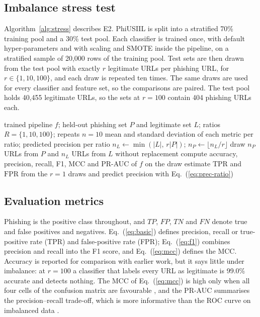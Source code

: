 \documentclass[pdflatex,sn-mathphys-num]{sn-jnl}%
\theoremstyle{thmstyleone}%
\theoremstyle{thmstyletwo}%
\theoremstyle{thmstylethree}%
\begin{document}
\subsection{Imbalance stress test}\label{subsec3-6}

Algorithm~\ref{alg:stress} describes E2. PhiUSIIL is split into a stratified 70\% training pool and a 30\% test pool. Each classifier is trained once, with default hyper-parameters and with scaling and SMOTE inside the pipeline, on a stratified sample of 20,000 rows of the training pool. Test sets are then drawn from the test pool with exactly $r$ legitimate URLs per phishing URL, for $r \in \{1, 10, 100\}$, and each draw is repeated ten times. The same draws are used for every classifier and feature set, so the comparisons are paired. The test pool holds 40,455 legitimate URLs, so the sets at $r=100$ contain 404 phishing URLs each.

\begin{algorithm}
\caption{Imbalance stress test (E2)}\label{alg:stress}
\begin{algorithmic}[1]
\Require trained pipeline $f$; held-out phishing set $P$ and legitimate set $L$; ratios $R=\{1,10,100\}$; repeats $n=10$
\Ensure mean and standard deviation of each metric per ratio; predicted precision per ratio
    \State $n_L \gets \min(|L|,\, r|P|)$; \quad $n_P \gets \lfloor n_L / r \rfloor$
    \State draw $n_P$ URLs from $P$ and $n_L$ URLs from $L$ without replacement
    \State compute accuracy, precision, recall, F1, MCC and PR-AUC of $f$ on the draw
  \EndFor
\EndFor
\State estimate $\mathrm{TPR}$ and $\mathrm{FPR}$ from the $r=1$ draws and predict precision with Eq.~(\ref{eq:prec-ratio})
\end{algorithmic}
\end{algorithm}

\subsection{Evaluation metrics}\label{subsec3-7}

Phishing is the positive class throughout, and $TP$, $FP$, $TN$ and $FN$ denote true and false positives and negatives. Eq.~(\ref{eq:basic}) defines precision, recall or true-positive rate (TPR) and false-positive rate (FPR); Eq.~(\ref{eq:f1}) combines precision and recall into the F1 score, and Eq.~(\ref{eq:mcc}) defines the MCC. Accuracy is reported for comparison with earlier work, but it says little under imbalance: at $r=100$ a classifier that labels every URL as legitimate is 99.0\% accurate and detects nothing. The MCC of Eq.~(\ref{eq:mcc}) is high only when all four cells of the confusion matrix are favourable \cite{chicco2020}, and the PR-AUC summarises the precision--recall trade-off, which is more informative than the ROC curve on imbalanced data \cite{saito2015}.
\end{document}
